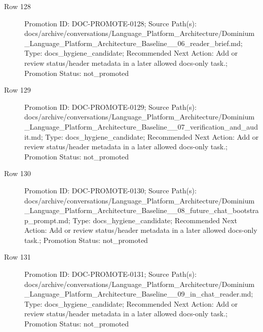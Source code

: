 \documentclass[9pt,a4paper,openany]{book}
\begin{document}
\begin{description}
\item[Row 128] Promotion ID: DOC-\allowbreak{}PROMOTE-\allowbreak{}0128; Source Path(s): docs/\allowbreak{}archive/\allowbreak{}conversations/\allowbreak{}Language\_\allowbreak{}Platform\_\allowbreak{}Architecture/\allowbreak{}Dominium\_\allowbreak{}Language\_\allowbreak{}Platform\_\allowbreak{}Architecture\_\allowbreak{}Baseline\_\allowbreak{}\_\allowbreak{}06\_\allowbreak{}reader\_\allowbreak{}brief.\allowbreak{}md; Type: docs\_\allowbreak{}hygiene\_\allowbreak{}candidate; Recommended Next Action: Add or review status/\allowbreak{}header metadata in a later allowed docs-\allowbreak{}only task.\allowbreak{}; Promotion Status: not\_\allowbreak{}promoted
\item[Row 129] Promotion ID: DOC-\allowbreak{}PROMOTE-\allowbreak{}0129; Source Path(s): docs/\allowbreak{}archive/\allowbreak{}conversations/\allowbreak{}Language\_\allowbreak{}Platform\_\allowbreak{}Architecture/\allowbreak{}Dominium\_\allowbreak{}Language\_\allowbreak{}Platform\_\allowbreak{}Architecture\_\allowbreak{}Baseline\_\allowbreak{}\_\allowbreak{}07\_\allowbreak{}verification\_\allowbreak{}and\_\allowbreak{}audit.\allowbreak{}md; Type: docs\_\allowbreak{}hygiene\_\allowbreak{}candidate; Recommended Next Action: Add or review status/\allowbreak{}header metadata in a later allowed docs-\allowbreak{}only task.\allowbreak{}; Promotion Status: not\_\allowbreak{}promoted
\item[Row 130] Promotion ID: DOC-\allowbreak{}PROMOTE-\allowbreak{}0130; Source Path(s): docs/\allowbreak{}archive/\allowbreak{}conversations/\allowbreak{}Language\_\allowbreak{}Platform\_\allowbreak{}Architecture/\allowbreak{}Dominium\_\allowbreak{}Language\_\allowbreak{}Platform\_\allowbreak{}Architecture\_\allowbreak{}Baseline\_\allowbreak{}\_\allowbreak{}08\_\allowbreak{}future\_\allowbreak{}chat\_\allowbreak{}bootstrap\_\allowbreak{}prompt.\allowbreak{}md; Type: docs\_\allowbreak{}hygiene\_\allowbreak{}candidate; Recommended Next Action: Add or review status/\allowbreak{}header metadata in a later allowed docs-\allowbreak{}only task.\allowbreak{}; Promotion Status: not\_\allowbreak{}promoted
\item[Row 131] Promotion ID: DOC-\allowbreak{}PROMOTE-\allowbreak{}0131; Source Path(s): docs/\allowbreak{}archive/\allowbreak{}conversations/\allowbreak{}Language\_\allowbreak{}Platform\_\allowbreak{}Architecture/\allowbreak{}Dominium\_\allowbreak{}Language\_\allowbreak{}Platform\_\allowbreak{}Architecture\_\allowbreak{}Baseline\_\allowbreak{}\_\allowbreak{}09\_\allowbreak{}in\_\allowbreak{}chat\_\allowbreak{}reader.\allowbreak{}md; Type: docs\_\allowbreak{}hygiene\_\allowbreak{}candidate; Recommended Next Action: Add or review status/\allowbreak{}header metadata in a later allowed docs-\allowbreak{}only task.\allowbreak{}; Promotion Status: not\_\allowbreak{}promoted

\end{description}
\end{document}

